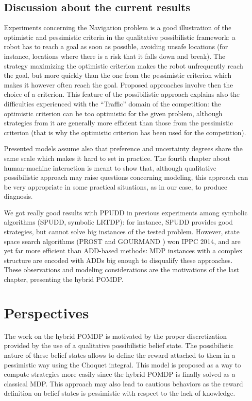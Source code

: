 \subsection*{Discussion about the current results}
Experiments concerning the Navigation problem
is a good illustration of the optimistic and pessimistic criteria
in the qualitative possibilistic framework: 
a robot has to reach a goal as soon as possible,
avoiding unsafe locations 
(for instance, locations where there is a risk that it falls down and break).
The strategy maximizing 
the optimistic criterion 
makes the robot 
unfrequently reach the goal,
but more quickly
than the one from the pessimistic criterion
which makes it however often reach the goal.  
Proposed approaches involve then 
the choice of a criterion.
This feature of the possibilistic approach
explains also the difficulties experienced
with the ``Traffic'' domain
of the competition: 
the optimistic criterion can be too optimistic
for the given problem, 
although strategies from it are generally 
more efficient than those from the pessimistic criterion
(that is why the optimistic criterion has been used for the competition).

Presented models 
assume also that preference
and uncertainty degrees
share the same scale
which makes it hard to
set in practice.
The fourth chapter about human-machine interaction
is meant to show that,
although qualitative possibilistic approach
may raise questions concerning modeling,
this approach can be very appropriate
in some practical situations,
as in our case, to produce diagnosis.

We got really good results 
with PPUDD in previous experiments 
among symbolic algorithms (SPUDD, symbolic LRTDP):
for instance, SPUDD provides good strategies, but 
cannot solve big instances of the tested problem. 
However, state space search algorithms
(PROST \cite{DBLP:conf/aips/KellerE12} and GOURMAND \cite{DBLP:conf/aaai/KolobovMW12}) won IPPC 2014,
and are yet far more efficient than ADD-based methods:
MDP instances with a complex structure
are encoded with ADDs big enough
to disqualify these approaches.
These observations and modeling considerations
are the motivations of the last chapter,
presenting the hybrid POMDP.



\section*{Perspectives}
The work on the hybrid POMDP is motivated 
by the proper discretization 
provided by the use 
of a qualitative possibilistic belief state.
The possibilistic nature of these belief states 
allows to define the reward attached to them 
in a pessimistic way using the Choquet integral.
This model is proposed as a way to compute
strategies more easily since the hybrid POMDP
is finally solved as a classical MDP.
This approach may also lead to cautious behaviors
as the reward definition on belief states is pessimistic
with respect to the lack of knowledge.

